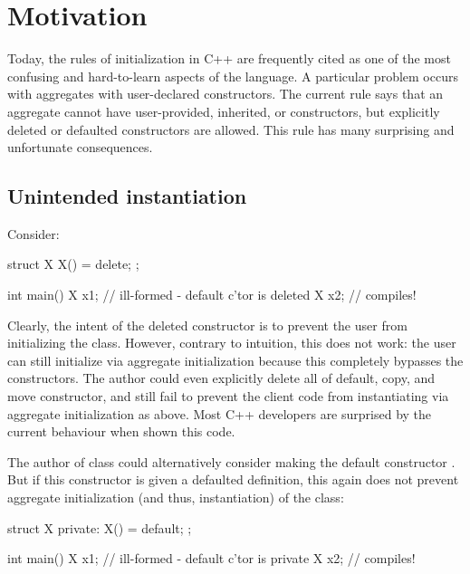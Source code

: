 \section{Motivation}
\label{sec:motivation}

Today, the rules of initialization in C++ are frequently cited as one of the most confusing and hard-to-learn aspects of the language. A particular problem occurs with aggregates with user-declared constructors. The current rule says that an aggregate cannot have user-provided, inherited, or  constructors, but explicitly deleted or defaulted constructors are allowed. This rule has many surprising and unfortunate consequences.


\subsection{Unintended instantiation}

Consider:

\begin{codeblock}
struct X {
  X() = delete;
};

int main() {
  X x1;    // ill-formed - default c'tor is deleted
  X x2{};  // compiles!
}
\end{codeblock}

Clearly, the intent of the deleted constructor is to prevent the user from initializing the class. However, contrary to intuition, this does not work: the user can still initialize  via aggregate initialization because this completely bypasses the constructors. The author could even explicitly delete all of default, copy, and move constructor, and still fail to prevent the client code from instantiating  via aggregate initialization as above. Most C++ developers are surprised by the current behaviour when shown this code.

The author of class  could alternatively consider making the default constructor . But if this constructor is given a defaulted definition, this again does not prevent aggregate initialization (and thus, instantiation) of the class:

\begin{codeblock}
struct X {
private:
  X() = default;
};

int main() {
  X x1;    // ill-formed - default c'tor is private
  X x2{};  // compiles!
}
\end{codeblock}

